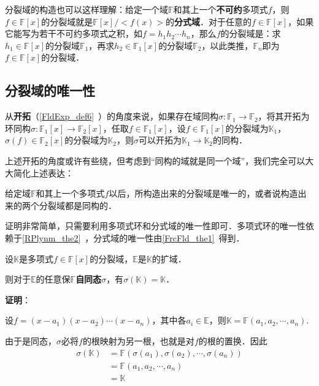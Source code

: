 分裂域的构造也可以这样理解：给定一个域$\mathbb{F}$和其上一个\textbf{不可约}多项式$f$，则$f\in\mathbb{F}[x]$的分裂域就是$\mathbb{F}[x]/<f(x)>$的\textbf{分式域}．对于任意的$f\in\mathbb{F}[x]$，如果它能写为若干不可约多项式之积，如$f=h_1h_2\cdots h_n$，那么$f$的分裂域是：求$h_1\in\mathbb{F}[x]$的分裂域$\mathbb{F}_1$，再求$h_2\in\mathbb{F}_1[x]$的分裂域$\mathbb{F}_2$，以此类推，$\mathbb{F}_n$即为$f\in\mathbb{F}[x]$的分裂域．










\subsection{分裂域的唯一性}

从\textbf{开拓}（\autoref{FldExp_def6}~）的角度来说，如果存在域同构$\sigma:\mathbb{F}_1\to\mathbb{F}_2$，将其开拓为环同构$\sigma:\mathbb{F}_1[x]\to\mathbb{F}_2[x]$，任取$f\in\mathbb{F}_1[x]$，设$f\in\mathbb{F}_1[x]$的分裂域为$\mathbb{K}_1$，$\sigma(f)\in\mathbb{F}_2[x]$的分裂域为$\mathbb{K}_2$，则$\sigma$可以开拓为$\mathbb{K}_1\to\mathbb{K}_2$的同构．

上述开拓的角度或许有些绕，但考虑到“同构的域就是同一个域”，我们完全可以大大简化上述表达：

\begin{theorem}{}
给定域$\mathbb{F}$和其上一个多项式$f$以后，所构造出来的分裂域是唯一的，或者说构造出来的两个分裂域都是同构的．
\end{theorem}

证明非常简单，只需要利用多项式环和分式域的唯一性即可．多项式环的唯一性依赖于\autoref{RPlynm_the2}~，分式域的唯一性由\autoref{FrcFld_the1}~得到．





\begin{theorem}{}\label{SpltFd_the3}
设$\mathbb{K}$是多项式$f\in\mathbb{F}[x]$的分裂域，$\mathbb{E}$是$\mathbb{K}$的扩域．

则对于$\mathbb{E}$的任意保$\mathbb{F}$\textbf{自同态}$\sigma$，有$\sigma(\mathbb{K})=\mathbb{K}$．
\end{theorem}

\textbf{证明}：

设$f=(x-a_1)(x-a_2)\cdots(x-a_n)$，其中各$a_i\in\mathbb{E}$，则$\mathbb{K}=\mathbb{F}(a_1, a_2, \cdots, a_n)$.

由于是同态，$\sigma$必将$f$的根映射为另一根，也就是对$f$的根的置换．因此
\begin{equation}
\begin{aligned}
\sigma(\mathbb{K})&=\mathbb{F}(\sigma(a_1), \sigma(a_2), \cdots, \sigma(a_n))\\
&=\mathbb{F}(a_1, a_2, \cdots, a_n)\\
&=\mathbb{K}
\end{aligned}
\end{equation}


